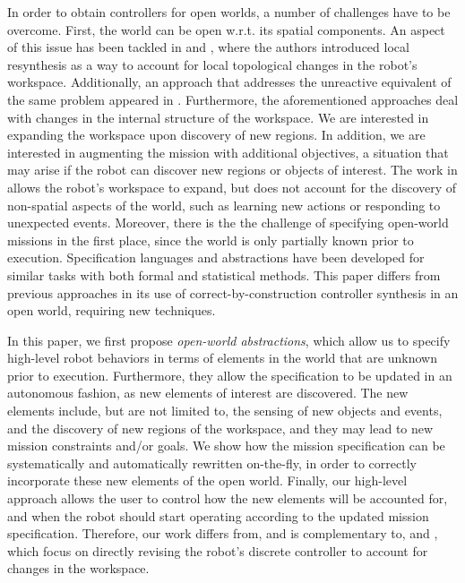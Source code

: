 In order to obtain controllers for open worlds, a number of challenges have to be overcome. 
First, the world can be open w.r.t. its spatial components. An aspect of this issue has been tackled in \cite{MurrayICRA2012} and \cite{MurrayICRA2013a}, where the authors introduced local resynthesis as a way to account for local topological changes in the robot's workspace. 
Additionally, an approach that addresses the unreactive equivalent of the same problem appeared in \cite{Dimos2013ICRA}. 
Furthermore, the aforementioned approaches deal with changes in the internal structure of the workspace. We are interested in expanding the workspace upon discovery of new regions.
In addition, we are interested in augmenting the mission with additional objectives, a situation that may arise if the robot can discover new regions or objects of interest. 
The work in \cite{BingxinRSS2012} allows the robot's workspace to expand, but does not account for the discovery of non-spatial aspects of the world, such as learning new actions or responding to unexpected events.
Moreover, there is the the challenge of specifying open-world missions in the first place, since the world is only partially known prior to execution. 
Specification languages and abstractions have been developed for similar tasks with both formal \cite{Joshi2012, MatthiasAI2010} and statistical \cite{Tellex2011} methods.
This paper differs from previous approaches in its use of correct-by-construction controller synthesis in an open world, requiring new techniques.

In this paper, we first propose \emph{open-world abstractions}, which allow us to specify high-level robot behaviors in terms of elements in the world that are unknown prior to execution.
Furthermore, they allow the specification to be updated in an autonomous fashion, as new elements of interest are discovered. The new elements include, but are not limited to, the sensing of new objects and events, and the discovery of new regions of the workspace, and they may lead to new mission constraints and/or goals.
We show how the mission specification can be systematically and automatically rewritten on-the-fly, in order to correctly incorporate these new elements of the open world. 
Finally, our high-level approach allows the user to control how the new elements will be accounted for, and when the robot should start operating according to the updated mission specification. Therefore, our work differs from, and is complementary to, \cite{MurrayICRA2012} and \cite{MurrayICRA2013a}, which focus on directly revising the robot's discrete controller to account for changes in the workspace.

